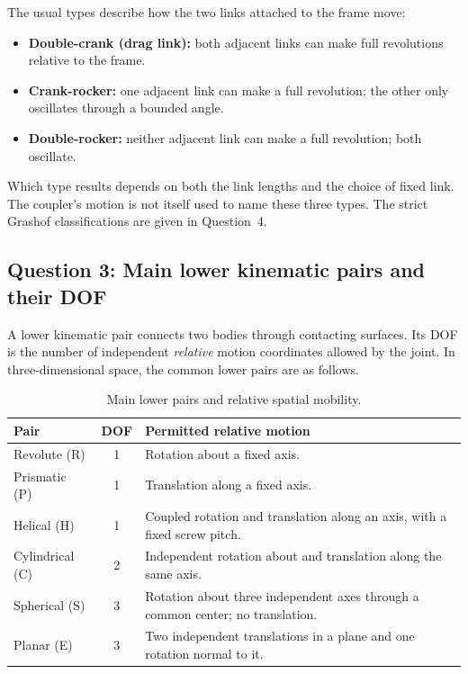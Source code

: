 \documentclass[11pt,a4paper]{article}
\begin{document}
The usual types describe how the two links attached to the frame move:
\begin{itemize}
  \item \textbf{Double-crank (drag link):} both adjacent links can make full
    revolutions relative to the frame.
  \item \textbf{Crank-rocker:} one adjacent link can make a full revolution;
    the other only oscillates through a bounded angle.
  \item \textbf{Double-rocker:} neither adjacent link can make a full
    revolution; both oscillate.
\end{itemize}
Which type results depends on both the link lengths and the choice of fixed
link. The coupler's motion is not itself used to name these three types.
The strict Grashof classifications are given in Question~4.

\subsection{Question 3: Main lower kinematic pairs and their DOF}
A lower kinematic pair connects two bodies through contacting surfaces.
Its DOF is the number of independent \emph{relative} motion coordinates
allowed by the joint. In three-dimensional space, the common lower pairs
are as follows.

\begin{table}[H]
  \centering
  \caption{Main lower pairs and relative spatial mobility.}
  \begin{tabularx}{\linewidth}{@{}l c X@{}}
    \toprule
    Pair & DOF & Permitted relative motion\\
    \midrule
    Revolute (R) & 1 & Rotation about a fixed axis.\\
    Prismatic (P) & 1 & Translation along a fixed axis.\\
    Helical (H) & 1 & Coupled rotation and translation along an axis, with a fixed screw pitch.\\
    Cylindrical (C) & 2 & Independent rotation about and translation along the same axis.\\
    Spherical (S) & 3 & Rotation about three independent axes through a common center; no translation.\\
    Planar (E) & 3 & Two independent translations in a plane and one rotation normal to it.\\
    \bottomrule
  \end{tabularx}
\end{table}
\end{document}
